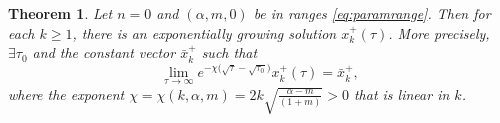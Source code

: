 \documentclass[a4paper,11pt]{article}
\newtheorem{theorem}{Theorem}
\theoremstyle{remark}
\begin{document}
\begin{theorem} \label{thm:Hadamard} Let $n=0$ and $(\alpha,m,0)$ be in ranges \eqref{eq:paramrange}. Then for each $k\ge1$, there is an exponentially growing solution $x_k^+(\tau)$. More precisely, $\exists \tau_0$ and the constant vector $\bar{x}_{k}^+$ such that
$$\lim_{\tau \rightarrow \infty} e^{-\chi \big(\sqrt{\tau}-\sqrt{\tau_0}\big)} x_k^+(\tau) = \bar{x}_{k}^+,$$
where the exponent $\chi=\chi(k,\alpha,m)=2k\sqrt{\frac{\alpha-m}{(1+m)}}> 0$ that is linear in $k$. %
\end{theorem}
\end{document}
